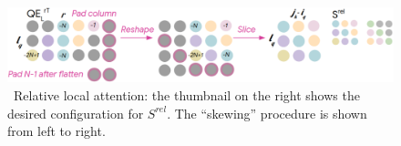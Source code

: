 \begin{figure}
    \centering
    \includegraphics[width=\textwidth]{assets/relative-local-attention}
    \caption{~Relative local attention: the thumbnail on the right shows the desired configuration for $S^{rel}$. The ``skewing'' procedure is shown from left to right.~\cite{music-transformer}}\label{fig:relative-local-attention}
\end{figure}


